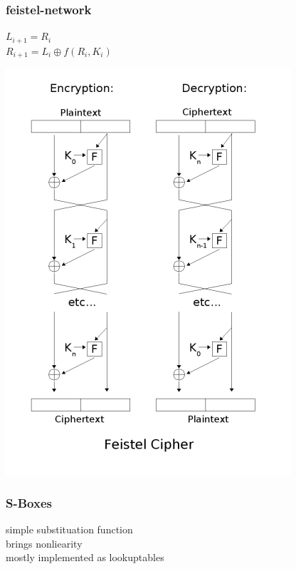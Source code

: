 \begin{frame}
\frametitle{feistel-network}
	$L_{i+1} = R_i $ \\
	$R_{i+1} = L_i \oplus f(R_i, K_i)$
	\begin{center}
		\includegraphics[scale=0.3]{Feistel}
	\end{center}
\end{frame}


\begin{frame}
\frametitle{S-Boxes}
	simple substituation function\\
	brings nonliearity\\
	mostly implemented as lookuptables
\end{frame}
